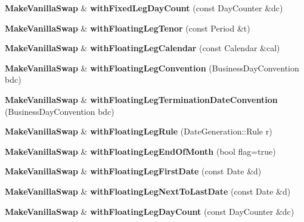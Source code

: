 \begin{DoxyCompactItemize}
\item 
{\bf Make\+Vanilla\+Swap} \& {\bfseries with\+Fixed\+Leg\+Day\+Count} (const Day\+Counter \&dc)\label{class_quant_lib_1_1_make_vanilla_swap_adc4591cee65b25cea8b5a85df6b6e538}

\item 
{\bf Make\+Vanilla\+Swap} \& {\bfseries with\+Floating\+Leg\+Tenor} (const Period \&t)\label{class_quant_lib_1_1_make_vanilla_swap_ae8bcd0d25ea373d2394ef993e2e70527}

\item 
{\bf Make\+Vanilla\+Swap} \& {\bfseries with\+Floating\+Leg\+Calendar} (const Calendar \&cal)\label{class_quant_lib_1_1_make_vanilla_swap_ae7768f6bd84421c8795ec4730ba361e4}

\item 
{\bf Make\+Vanilla\+Swap} \& {\bfseries with\+Floating\+Leg\+Convention} (Business\+Day\+Convention bdc)\label{class_quant_lib_1_1_make_vanilla_swap_abb8e2db27bcab595967fead6432851bc}

\item 
{\bf Make\+Vanilla\+Swap} \& {\bfseries with\+Floating\+Leg\+Termination\+Date\+Convention} (Business\+Day\+Convention bdc)\label{class_quant_lib_1_1_make_vanilla_swap_a079635fdfaf7a91c923a1934d87d21f1}

\item 
{\bf Make\+Vanilla\+Swap} \& {\bfseries with\+Floating\+Leg\+Rule} (Date\+Generation\+::\+Rule r)\label{class_quant_lib_1_1_make_vanilla_swap_a37bc453204c7e7e53284871e4d6901fe}

\item 
{\bf Make\+Vanilla\+Swap} \& {\bfseries with\+Floating\+Leg\+End\+Of\+Month} (bool flag=true)\label{class_quant_lib_1_1_make_vanilla_swap_adfb2b702b50499dfa59c9892a0fc344d}

\item 
{\bf Make\+Vanilla\+Swap} \& {\bfseries with\+Floating\+Leg\+First\+Date} (const Date \&d)\label{class_quant_lib_1_1_make_vanilla_swap_a613a432dfd4afac2a5ba164f7019079e}

\item 
{\bf Make\+Vanilla\+Swap} \& {\bfseries with\+Floating\+Leg\+Next\+To\+Last\+Date} (const Date \&d)\label{class_quant_lib_1_1_make_vanilla_swap_ac5225aa597c7e269461e5c5be455ac25}

\item 
{\bf Make\+Vanilla\+Swap} \& {\bfseries with\+Floating\+Leg\+Day\+Count} (const Day\+Counter \&dc)\label{class_quant_lib_1_1_make_vanilla_swap_a3e53a4cbb6f3a26ea513e58191dc2618}


\end{DoxyCompactItemize}
